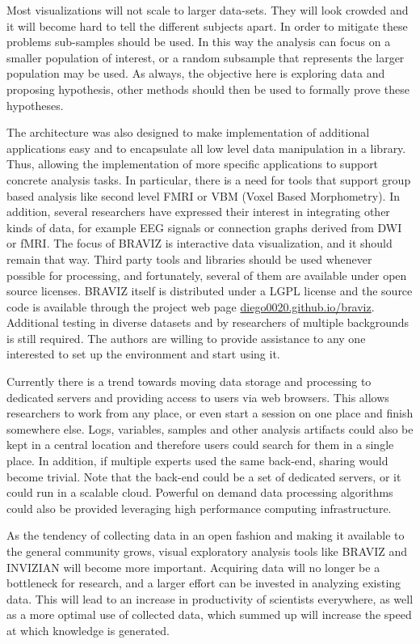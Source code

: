 \documentclass[twocolumn]{svjour3}
\begin{document}
Most visualizations will not scale to larger data-sets. They will look crowded and it will become hard to tell the different subjects apart. In order to mitigate these problems sub-samples should be used. In this way the analysis can focus on a smaller population of interest, or a random subsample that represents the larger population may be used. As always, the objective here is exploring data and proposing hypothesis, other methods should then be used to formally prove these hypotheses.

The architecture was also designed to make implementation of additional applications easy and to encapsulate all low level data manipulation in a library. Thus, allowing the implementation of more specific applications to support concrete analysis tasks. In particular, there is a need for tools that support group based analysis like second level FMRI or VBM (Voxel Based Morphometry). In addition, several researchers have expressed their interest in integrating other kinds of data, for example EEG signals or connection graphs \cite{rubinov_complex_2010} derived from DWI or fMRI.  
The focus of BRAVIZ is interactive data visualization, and it should remain that way. Third party tools and libraries should be used whenever possible for processing, and fortunately, several of them are available under open source licenses. BRAVIZ itself is distributed under a LGPL license and the source code is available through the project web page \url{diego0020.github.io/braviz}. Additional testing in diverse datasets and by researchers of multiple backgrounds is still required. The authors are willing to provide assistance to any one interested to set up the environment and start using it. 
  
Currently there is a trend towards moving data storage and processing to dedicated servers and providing access to users via web browsers. This allows researchers to work from any place, or even start a session on one place and finish somewhere else. Logs, variables, samples and other analysis artifacts could also be kept in a central location and therefore users could search for them in a single place. In addition, if multiple experts used the same back-end, sharing would become trivial. Note that the back-end could be a set of dedicated servers, or it could run in a scalable cloud. Powerful on demand data processing algorithms could also be provided leveraging high performance computing infrastructure. 

As the tendency of collecting data in an open fashion and making it available to the general community grows, visual exploratory analysis tools like BRAVIZ and INVIZIAN will become more important. Acquiring data will no longer be a bottleneck for research, and a larger effort can be invested in analyzing existing data. This will lead to an increase in productivity of scientists everywhere, as well as a more optimal use of collected data, which summed up will increase the speed at which knowledge is generated.
\end{document}
